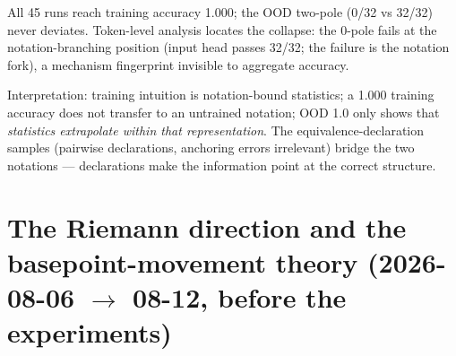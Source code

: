 \documentclass[sigplan,10pt,anonymous,review]{acmart}
\begin{document}
All 45 runs reach training accuracy 1.000; the OOD two-pole (0/32 vs 32/32)
never deviates. Token-level analysis locates the collapse: the 0-pole fails at
the notation-branching position (input head passes 32/32; the failure is the
notation fork), a mechanism fingerprint invisible to aggregate accuracy.

Interpretation: training intuition is notation-bound statistics; a 1.000
training accuracy does not transfer to an untrained notation; OOD 1.0 only
shows that \emph{statistics extrapolate within that representation}. The
equivalence-declaration samples (pairwise declarations, anchoring errors
irrelevant) bridge the two notations --- declarations make the information
point at the correct structure.

\section{The Riemann direction and the basepoint-movement theory (2026-08-06 $\to$ 08-12, before the experiments)}
\end{document}

